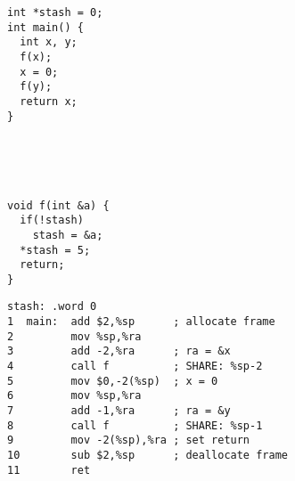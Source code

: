 \documentclass[10pt,conference]{ieeetran}%
\theoremstyle{definition}
\begin{document}
{\newcommand{\mainpassc}{magenta}

\begin{figure*}
  \centering
  \begin{subfigure}[t]{.2\textwidth}
{\small
\begin{lstlisting}
int *stash = 0;
int main() {
  int x, y;
  f(x);
  x = 0;
  f(y);
  return x;
}





void f(int &a) {
  if(!stash)
    stash = &a;
  *stash = 5;
  return;
}
\end{lstlisting}
}
  \end{subfigure}
  \begin{subfigure}[t]{.5\textwidth}
{\small
  \begin{lstlisting}[backgroundcolor=\color{lgray}]
   stash: .word 0
1  main:  add $2,%sp      ; allocate frame
2         mov %sp,%ra
3         add -2,%ra      ; ra = &x
4         call f          ; SHARE: %sp-2
5         mov $0,-2(%sp)  ; x = 0
6         mov %sp,%ra
7         add -1,%ra      ; ra = &y
8         call f          ; SHARE: %sp-1
9         mov -2(%sp),%ra ; set return
10        sub $2,%sp      ; deallocate frame
11        ret


\end{lstlisting}}
\end{subfigure}
\end{figure*}}
\end{document}
